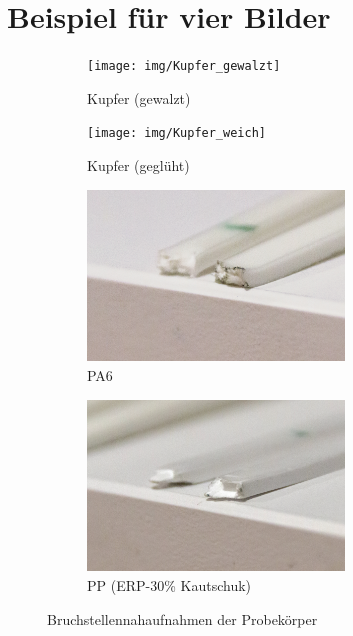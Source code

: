 \newpage


\section{Beispiel für vier Bilder}
\begin{figure}[h!]
	\centering
	\begin{subfigure}{.5\textwidth}
		\centering
		\texttt{[image: img/Kupfer\_gewalzt]}
		\caption{Kupfer (gewalzt)}
		\label{fig:sub3}
	\end{subfigure}%
	\begin{subfigure}{.5\textwidth}
		\centering
		\texttt{[image: img/Kupfer\_weich]}
		\caption{Kupfer (geglüht)}
		\label{fig:sub4}
	\end{subfigure}
	\begin{subfigure}{.5\textwidth}
		\centering
		\includegraphics[width=0.75\textwidth]{img/PA6}
		\caption{PA6}
		\label{fig:sub5}
	\end{subfigure}%
	\begin{subfigure}{.5\textwidth}
		\centering
		\includegraphics[width=0.75\textwidth]{img/PP}
		\caption{PP (ERP-30\% Kautschuk)}
		\label{fig:sub6}
	\end{subfigure}
	
	\caption{Bruchstellennahaufnahmen der Probekörper}
	\label{fig:bruchstellen} 
\end{figure}
\FloatBarrier

